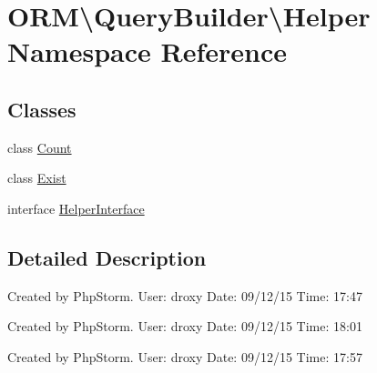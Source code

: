 \hypertarget{namespaceORM_1_1QueryBuilder_1_1Helper}{}\section{O\+RM\textbackslash{}Query\+Builder\textbackslash{}Helper Namespace Reference}
\label{namespaceORM_1_1QueryBuilder_1_1Helper}
\subsection*{Classes}
\begin{DoxyCompactItemize}
\item 
class \hyperlink{classORM_1_1QueryBuilder_1_1Helper_1_1Count}{Count}
\item 
class \hyperlink{classORM_1_1QueryBuilder_1_1Helper_1_1Exist}{Exist}
\item 
interface \hyperlink{interfaceORM_1_1QueryBuilder_1_1Helper_1_1HelperInterface}{Helper\+Interface}
\end{DoxyCompactItemize}


\subsection{Detailed Description}
Created by Php\+Storm. User\+: droxy Date\+: 09/12/15 Time\+: 17\+:47

Created by Php\+Storm. User\+: droxy Date\+: 09/12/15 Time\+: 18\+:01

Created by Php\+Storm. User\+: droxy Date\+: 09/12/15 Time\+: 17\+:57 